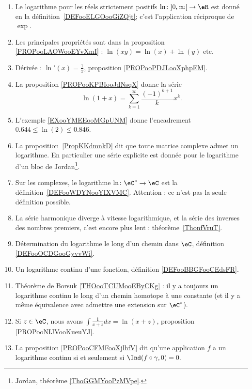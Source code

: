 
\begin{enumerate}
	\item
	      Le logarithme pour les réels strictement positifs \( \ln\colon \mathopen] 0 , \infty \mathclose[\to \eR\) est donné en la définition~\ref{DEFooELGOooGiZQjt}; c'est l'application réciproque de \( \exp\).
	\item
	      Les principales propriétés sont dans la proposition \ref{PROPooLAOWooEYvXmI} : \( \ln(xy)=\ln(x)+\ln(y)\) etc.
	\item
	      Dérivée : \( \ln'(x)=\frac{1}{ x }\), proposition \ref{PROPooPDJLooXphpEM}.
	\item
	      La proposition \ref{PROPooKPBIooJdNsqX} donne la série
	      \begin{equation}
		      \ln(1+x)=\sum_{k=1}^{\infty}\frac{ (-1)^{k+1} }{ k }x^k.
	      \end{equation}
	\item
	      L'exemple \ref{EXooYMEEooMGpUNM} donne l'encadrement \( 0.644\leq \ln(2)\leq 0.846\).
	\item
	      La proposition~\ref{PropKKdmnkD} dit que toute matrice complexe admet un logarithme. En particulier une série explicite est donnée pour le logarithme d'un bloc de Jordan\footnote{Jordan, théorème \ref{ThoGGMYooPzMVpe}.}.
	\item
	      Sur les complexes, le logarithme \( \ln \colon \eC^*\to \eC\) est la définition~\ref{DEFooWDYNooYIXVMC}. Attention : ce n'est pas la seule définition possible.
	\item
	      La série harmonique diverge à vitesse logarithmique, et la série des inverses des nombres premiers, c'est encore plus lent : théorème~\ref{ThonfVruT}.
      \item
          Détermination du logarithme le long d'un chemin dans \( \eC\), définition \ref{DEFooOCDGooGyvvWi}.
      \item
          Un logarithme continu d'une fonction, définition \ref{DEFooBBGFooCEdsFR}.
      \item
          Théorème de Borsuk \ref{THOooTCUMooEByCKg} : il y a toujours un logarithme continu le long d'un chemin homotope à une constante (et il y a même équivalence avec admettre une extension sur \( \eC^*\)).
      \item
          Si \( z\in \eC\), nous avons $\int\frac{1}{ x+z }dx=\ln(x+z)$, proposition \ref{PROPooNIJVooKueuYJ}.
      \item
          La proposition \ref{PROPooCFMFooXjlhfV} dit qu'une application \( f\) a un logarithme continu si et seulement si \( \Ind(f\circ\gamma,0)=0\).
\end{enumerate}

